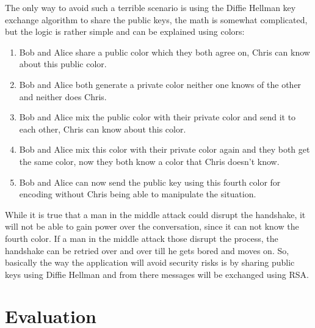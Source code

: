 \documentclass[twoside]{article}
\begin{document}
\begin{multicols}{2}
The only way to avoid such a terrible scenario is using the Diffie Hellman key exchange algorithm to share the public keys, the math is somewhat complicated, but the logic is rather simple and can be explained using colors:

\begin{enumerate}
  \item Bob and Alice share a public color which they both agree on, Chris can know about this public color.
  \item Bob and Alice both generate a private color neither one knows of the other and neither does Chris.
  \item Bob and Alice mix the public color with their private color and send it to each other, Chris can know about this color.
  \item Bob and Alice mix this color with their private color again and they both get the same color, now they both know a color that Chris doesn't know.
  \item Bob and Alice can now send the public key using this fourth color for encoding without Chris being able to manipulate the situation.
\end{enumerate}

While it is true that a man in the middle attack could disrupt the handshake, it will not be able to gain power over the conversation, since it can not know the fourth color. If a man in the middle attack those disrupt the process, the handshake can be retried over and over till he gets bored and moves on. So, basically the way the application will avoid security risks is by sharing public keys using Diffie Hellman and from there messages will be exchanged using RSA.

\section{Evaluation}


\end{multicols}
\end{document}
